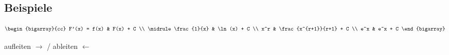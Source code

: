 \subsection{Beispiele}

\begin{table}[H]
	\[
		\begin{bigarray}{cc}
			F'(x) = f(x) & F(x) + C                \\
			\midrule
			\frac{1}{x}  & \ln(x) + C              \\
			x^r          & \frac{x^{r+1}}{r+1} + C \\
			e^x          & e^x + C
		\end{bigarray}
	\]
	\caption{aufleiten \( \rightarrow \) / ableiten \( \leftarrow \)}
\end{table}
